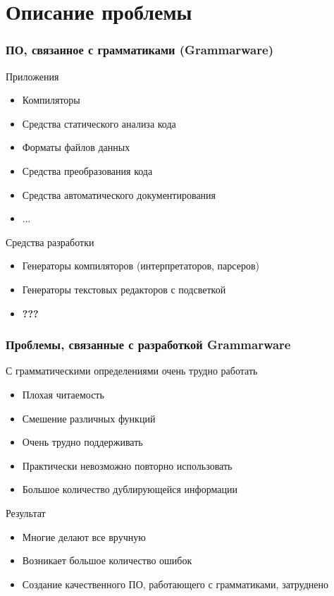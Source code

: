 \documentclass[paper=screen,10pt,unicode]{beamer}
\begin{document}
\section{Описание проблемы}
\begin{frame}
	\frametitle{ПО, связанное с грамматиками (Grammarware)}
	\begin{block}{Приложения}
		\begin{itemize}
			\item Компиляторы
			\item Средства статического анализа кода
			\item Форматы файлов данных
			\item Средства преобразования кода
			\item Средства автоматического документирования
			\item ...
		\end{itemize}
	\end{block}
	\begin{block}{Средства разработки}
		\begin{itemize}
			\item Генераторы компиляторов (интерпретаторов, парсеров)
			\item Генераторы текстовых редакторов с подсветкой
			\item \large \bf\alert{???}
		\end{itemize}
	\end{block}
\end{frame}

\begin{frame}
	\frametitle{Проблемы, связанные с разработкой Grammarware}

	\begin{block}{С грамматическими определениями очень трудно работать}
		\begin{itemize}
			\item Плохая читаемость
			\item Смешение различных функций
			\item Очень трудно поддерживать
			\item Практически невозможно повторно использовать
			\item Большое количество дублирующейся информации
		\end{itemize}
	\end{block}
	\begin{block}{Результат}
		\begin{itemize}
			\item Многие делают все вручную
			\item Возникает большое количество ошибок
			\item Создание качественного ПО, работающего с грамматиками, затруднено
		\end{itemize}
	\end{block}
\end{frame}
\end{document}
